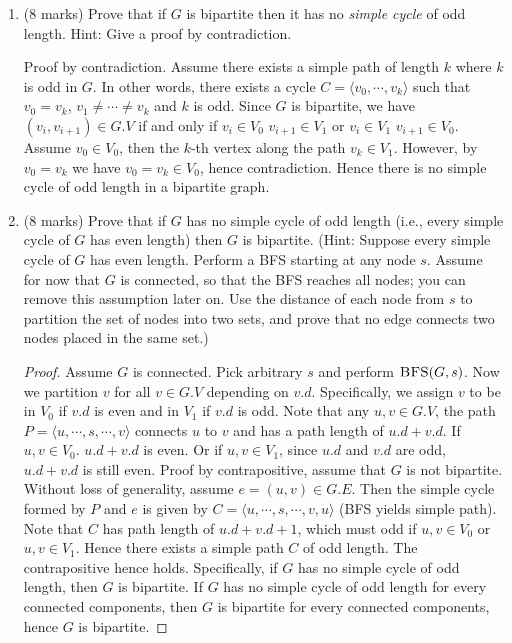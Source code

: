 \documentclass[11pt]{article}
\begin{document}
\begin{enumerate}[label=\alph*)]
\item (8 marks) Prove that if $G$ is bipartite then it has no \textit{simple cycle} of odd length. Hint: Give a proof by contradiction.

\begin{solution}
  Proof by contradiction. Assume there exists a simple path of length $k$ where $k$ is odd in $G$. In other words, there exists a cycle $C = \langle v_0, \cdots, v_k \rangle$ such that $v_0 = v_k$, $v_1\neq \cdots\neq v_k$ and $k$ is odd. Since $G$ is bipartite, we have $(v_i, v_{i+1}) \in G.V$ if and only if $v_i \in V_0 \,\, v_{i+1}\in V_1$ or $v_i \in V_1 \,\, v_{i+1}\in V_0$. Assume $v_0\in V_0$, then the $k$-th vertex along the path $v_k \in V_1$. However, by $v_0 = v_k$ we have $v_0 = v_k \in V_0$, hence contradiction. Hence there is no simple cycle of odd length in a bipartite graph.
\end{solution}

\item (8 marks) Prove that if $G$ has no simple cycle of odd length (i.e., every simple cycle of $G$ has even length) then $G$ is bipartite. (Hint: Suppose every simple cycle of $G$ has even length. Perform a BFS starting at any node $s$. Assume for now that $G$ is connected, so that the BFS reaches all nodes; you can remove this assumption later on. Use the distance of each node from $s$ to partition the set of nodes into two sets, and prove that no edge connects two nodes placed in the same set.)

\begin{proof}
    Assume $G$ is connected. Pick arbitrary $s$ and perform $\textsc{BFS}(G,s)$. Now we partition $v$ for all $v\in G.V$ depending on $v.d$. Specifically, we assign $v$ to be in $V_0$ if $v.d$ is even and in $V_1$ if $v.d$ is odd. Note that any $u,v\in G.V$, the path $P = \langle u, \cdots, s, \cdots, v\rangle$ connects $u$ to $v$ and has a path length of $u.d + v.d$. If $u, v\in V_0$. $u.d + v.d$ is even. Or if $u, v\in V_1$, since $u.d$ and $v.d$ are odd, $u.d + v.d$ is still even. Proof by contrapositive, assume that $G$ is not bipartite. Without loss of generality, assume $e = (u,v) \in G.E$. Then the simple cycle formed by $P$ and $e$ is given by $C = \langle u, \cdots, s, \cdots, v, u\rangle$ (BFS yields simple path). Note that $C$ has path length of $u.d + v.d + 1$, which must odd if $u,v\in V_0$ or $u,v\in V_1$. Hence there exists a simple path $C$ of odd length. The contrapositive hence holds. Specifically, if $G$ has no simple cycle of odd length, then $G$ is bipartite. If $G$ has no simple cycle of odd length for every connected components, then $G$ is bipartite for every connected components, hence $G$ is bipartite.
\end{proof}


\end{enumerate}
\end{document}
